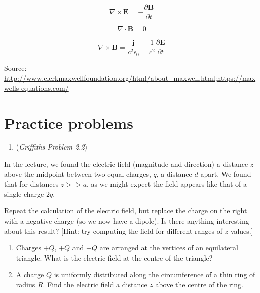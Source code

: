 \documentclass[
  letterpaper,
  DIV=11,
  numbers=noendperiod]{scrreprt}
\providecommand{\tightlist}{%
  \setlength{\itemsep}{0pt}\setlength{\parskip}{0pt}}\usepackage{longtable,booktabs,array}
\begin{document}
\begin{equation}
\nabla \times \mathbf{E} = - \frac{\partial \mathbf{B}}{\partial t} 
\end{equation}

\begin{equation}
\nabla \cdot \mathbf{B} = 0
\end{equation}

\begin{equation}
\nabla \times \mathbf{B} = \frac{\mathbf{j}}{c^2 \epsilon_0} + \frac{1}{c^2} \frac{\partial \mathbf{E}}{\partial t}
\end{equation}

Source:
\url{http://www.clerkmaxwellfoundation.org/html/about_maxwell.html};\url{https://maxwells-equations.com/}

\section{Practice problems}\label{practice-problems}

\begin{enumerate}
\def\labelenumi{\arabic{enumi})}
\tightlist
\item
  (\emph{Griffiths Problem 2.2})
\end{enumerate}

In the lecture, we found the electric field (magnitude and direction) a
distance \(z\) above the midpoint between two equal charges, \(q\), a
distance \(d\) apart. We found that for distances \(z >> a\), as we
might expect the field appears like that of a single charge \(2q\).

Repeat the calculation of the electric field, but replace the charge on
the right with a negative charge (so we now have a dipole). Is there
anything interesting about this result? {[}Hint: try computing the field
for different ranges of \(z\)-values.{]}

\begin{enumerate}
\def\labelenumi{\arabic{enumi})}
\setcounter{enumi}{1}
\item
  Charges \(+Q\), \(+Q\) and \(-Q\) are arranged at the vertices of an
  equilateral triangle. What is the electric field at the centre of the
  triangle?
\item
  A charge \(Q\) is uniformly distributed along the circumference of a
  thin ring of radius \(R\). Find the electric field a distance \(z\)
  above the centre of the ring.
\end{enumerate}
\end{document}
